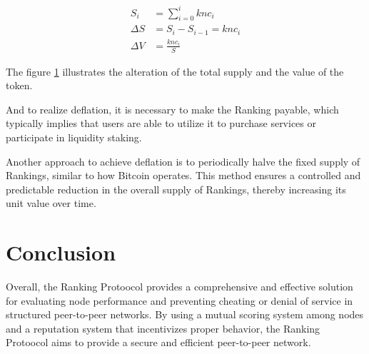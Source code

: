 \documentclass[twocolumn]{article}
\begin{document}
\begin{figure}[htbp]
  \label{supply}
\begin{align}
  S_i &= \sum_{i=0}^{i}knc_i\\
  \Delta S &= S_i - S_{i-1} = knc_i\\
  \Delta V &= \frac{knc_i}{S}
 \end{align}
\end{figure}

The figure \ref{supply} illustrates the alteration of the total supply and the value of the token.

And to realize deflation, it is necessary to make the Ranking payable, which typically implies that users are able to utilize it to purchase services or participate in liquidity staking.

Another approach to achieve deflation is to periodically halve the fixed supply of Rankings, similar to how Bitcoin operates. This method ensures a controlled and predictable reduction in the overall supply of Rankings, thereby increasing its unit value over time.


\section{Conclusion}
Overall, the Ranking Protoocol provides a comprehensive and effective solution for evaluating node performance and preventing cheating or denial of service in structured peer-to-peer networks. By using a mutual scoring system among nodes and a reputation system that incentivizes proper behavior, the Ranking Protoocol aims to provide a secure and efficient peer-to-peer network.


\end{document}
